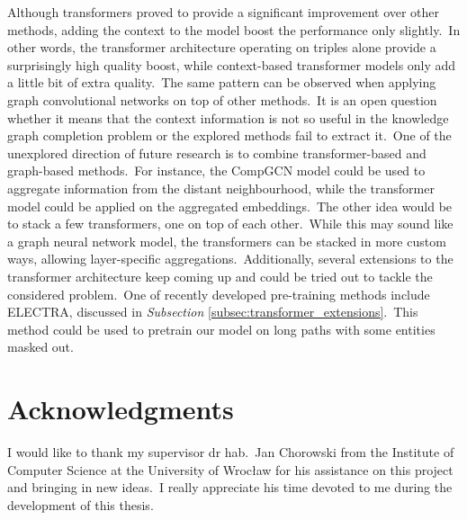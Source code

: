 \documentclass[longabstract, english, mgr]{iithesis}
\theoremstyle{default_theorem_style}\newtheorem{theorem}{Theorem}
\theoremstyle{default_theorem_style}\newtheorem{definition}{Definition}
\begin{document}
Although transformers proved to provide a significant improvement over other methods, adding the context to the model
boost the performance only slightly.\ In other words, the transformer architecture operating on triples alone provide
a surprisingly high quality boost, while context-based transformer models only add a little bit of extra quality.\ The
same pattern can be observed when applying graph convolutional networks on top of other methods.\ It is an open
question whether it means that the context information is not so useful in the knowledge graph completion problem
or the explored methods fail to extract it.\ One of the unexplored direction of future research is to combine
transformer-based and graph-based methods.\ For instance, the CompGCN model could be used to aggregate information from
the distant neighbourhood, while the transformer model could be applied on the aggregated embeddings.\ The other idea
would be to stack a few transformers, one on top of each other.\ While this may sound like a graph neural network model,
the transformers can be stacked in more custom ways, allowing layer-specific aggregations.\ Additionally, several
extensions to the transformer architecture keep coming up and could be tried out to tackle the considered
problem.\ One of recently developed pre-training methods include ELECTRA, discussed in
\textit{Subsection} \ref{subsec:transformer_extensions}.\ This method could be used to pretrain our model on long paths
with some entities masked out.

\section{Acknowledgments}

I would like to thank my supervisor dr hab.\ Jan Chorowski from the Institute of Computer Science at the
University of Wrocław for his assistance on this project and bringing in new ideas.\ I really appreciate his time
devoted to me during the development of this thesis.
\end{document}
